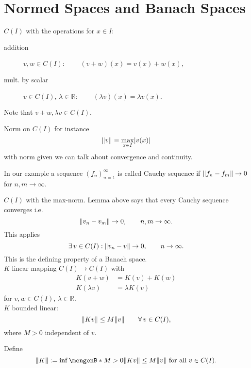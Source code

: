 \section{Normed Spaces and Banach Spaces} 
\label{sec:normed_spaces_and_banach_spaces}



\begin{definition*}
	$C(I)$ with the operations for $x \in I$:
	\begin{description}
		\item[addition] $v,w \in C(I)$: $\qquad (v+w)(x) = v(x)+ w(x)$, 
		\item[mult. by scalar] $v \in C(I)$, $ \lambda \in \mathbb{R}$: $\qquad (\lambda v)(x) = \lambda v(x)$.
	\end{description}
	Note that $v+w, \lambda v \in C(I)$.
\end{definition*}
\begin{definition*}[norm]
	Norm on $C(I)$ for instance 
	\[
		\norm{v} = \max_{x \in I} \abs{v(x)}
	\]
	with norm given we can talk about convergence and continuity.
\end{definition*}
\begin{definition*}
	In our example a sequence $(f_n)_{n=1}^{\infty}$ is called Cauchy sequence if $\norm{f_n-f_m} \to 0$ for $n,m \to \infty$.
\end{definition*}
\begin{definition*}
	$C(I)$ with the max-norm. Lemma above says that every Cauchy sequence converges i.e.
	\[
		\norm{v_n-v_m} \to 0, \qquad n,m \to \infty.
	\]
	This applies
	\[
		\exists\, v \in C(I): \norm{v_n-v} \to 0, \qquad n \to \infty.
	\]
	This is the defining property of a Banach space. \\
	$K$ linear mapping $C(I) \to C(I)$ with
	\begin{align*}
		K(v+w) &= K(v) + K(w) \\
		K(\lambda v) &= \lambda K(v)
	\end{align*}
	for $v,w \in  C(I)$, $\lambda \in \mathbb{R}$. \\
	$K$ bounded linear:
	\[
		\norm{Kv} \leq M \norm{v} \qquad \forall\, v \in C(I),
	\]
	where $M >0$ independent of $v$.	
\end{definition*}
\begin{definition*}
	Define
	\[
		\norm{K}:= \inf \set[M>0]{\norm{Kv} \leq M \norm{v} \text{ for all }v \in C(I)}.
	\]
\end{definition*}
